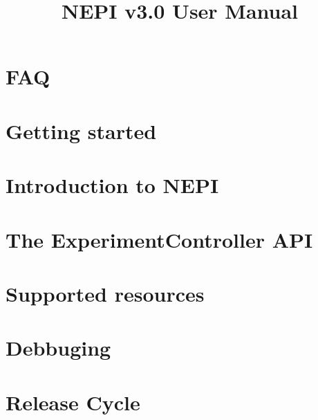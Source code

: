 \documentclass[12pt,openany]{memoir}
\title{NEPI v3.0 User Manual}
\date{}
\author{}
\begin{document}
\clearpage\maketitle
\thispagestyle{empty}

\pagebreak
\tableofcontents

\chapter{FAQ}
\label{faq}


\chapter{Getting started}
\label{getting_started}


\chapter{Introduction to NEPI}
\label{introduction}


\chapter{The ExperimentController API}
\label{ec_api}


\chapter{Supported resources}
\label{supported_resources}





\chapter{Debbuging}
\label{debugging}



\chapter{Release Cycle}
\label{release_cycle}


\end{document}
